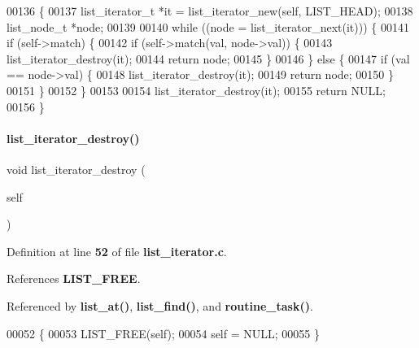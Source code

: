 \begin{DoxyCode}
00136                                                 \{
00137   list_iterator_t *it = list_iterator_new(\textcolor{keyword}{self}, LIST_HEAD);
00138   list_node_t *node;
00139 
00140   \textcolor{keywordflow}{while} ((node = list_iterator_next(it))) \{
00141     \textcolor{keywordflow}{if} (self->match) \{
00142       \textcolor{keywordflow}{if} (self->match(val, node->val)) \{
00143         list_iterator_destroy(it);
00144         \textcolor{keywordflow}{return} node;
00145       \}
00146     \} \textcolor{keywordflow}{else} \{
00147       \textcolor{keywordflow}{if} (val == node->val) \{
00148         list_iterator_destroy(it);
00149         \textcolor{keywordflow}{return} node;
00150       \}
00151     \}
00152   \}
00153 
00154   list_iterator_destroy(it);
00155   \textcolor{keywordflow}{return} NULL;
00156 \}
\end{DoxyCode}
\mbox{\label{a00029_ad16fa29ddbb444070ea65f871e1c0ba2}} 
\paragraph{list\+\_\+iterator\+\_\+destroy()}
{\footnotesize\ttfamily void list\+\_\+iterator\+\_\+destroy (\begin{DoxyParamCaption}\item[{\textbf{ list\+\_\+iterator\+\_\+t} $\ast$}]{self }\end{DoxyParamCaption})}



Definition at line \textbf{ 52} of file \textbf{ list\+\_\+iterator.\+c}.



References \textbf{ L\+I\+S\+T\+\_\+\+F\+R\+EE}.



Referenced by \textbf{ list\+\_\+at()}, \textbf{ list\+\_\+find()}, and \textbf{ routine\+\_\+task()}.


\begin{DoxyCode}
00052                                                   \{
00053   LIST_FREE(\textcolor{keyword}{self});
00054   \textcolor{keyword}{self} = NULL;
00055 \}
\end{DoxyCode}
\mbox{\label{a00029_a3c956afda343b4a6aaf68fbd4b446733}} 
